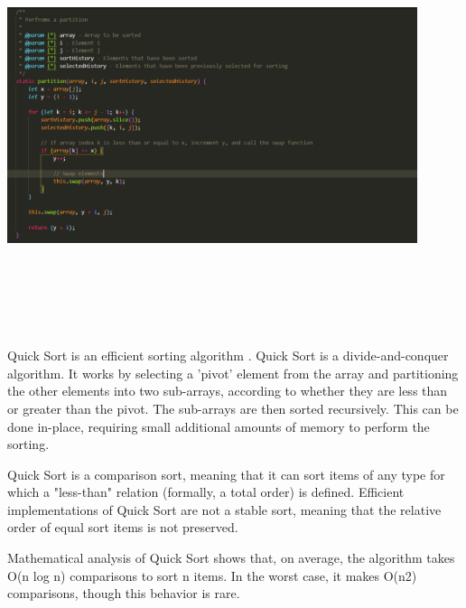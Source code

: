 \begin{center}
    \includegraphics[width=12cm,height=12cm,keepaspectratio]{images/quicksort2}
\end{center}
Quick Sort is an efficient sorting algorithm \cite{quick_sort}.
Quick Sort is a divide-and-conquer algorithm. It works by selecting a 'pivot' element from the array and partitioning the other elements into two sub-arrays, according to whether they are less than or greater than the pivot. The sub-arrays are then sorted recursively. This can be done in-place, requiring small additional amounts of memory to perform the sorting.
\par
\bigskip
Quick Sort is a comparison sort, meaning that it can sort items of any type for which a "less-than" relation (formally, a total order) is defined. Efficient implementations of Quick Sort are not a stable sort, meaning that the relative order of equal sort items is not preserved.
\par
\bigskip
Mathematical analysis of Quick Sort shows that, on average, the algorithm takes O(n log n) comparisons to sort n items. In the worst case, it makes O(n2) comparisons, though this behavior is rare.

